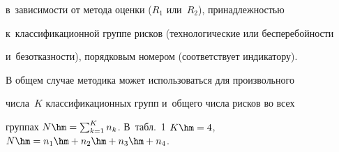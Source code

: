 в~зависимости от метода оценки ($R_1$ или~$R_2$), принадлежностью 


к~классификационной группе рисков (технологические или бесперебойности 


и~без\-от\-каз\-ности), порядковым номером (соответствует индикатору).


     


     В общем случае методика может использоваться для произвольного 


числа~$K$ классификационных групп и~общего числа рисков во всех 


группах $N\hm= \sum\nolimits^K_{k=1} n_k$. В~табл.~1 $K\hm=4$, $N\hm= 


n_1\hm+n_2\hm+n_3\hm+n_4$.






